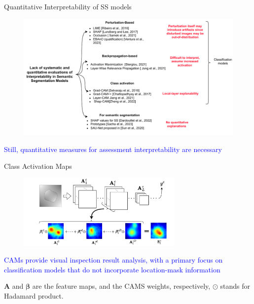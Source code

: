 \documentclass[aspectratio=169]{beamer}
\begin{document}
\begin{frame}{ Quantitative Interpretability of SS models}
\begin{figure}
    \centering
    \includegraphics[width=0.75\linewidth]{Figures/State-of-the-ar-obj3.pdf}
\end{figure}    
\vspace{-0.7cm}
\begin{center}
    \textcolor{blue}{Still, quantitative measures for assessment interpretability are necessary}
\end{center}

\end{frame}


\begin{frame}{Class Activation Maps}

\begin{figure}
    \centering
    \includegraphics[trim={1.1cm 0 0 0},clip,width=0.72\textwidth]{Figures/camsSchema.pdf}

\end{figure}

\begin{center}
    \textcolor{blue}{CAMs provide visual inspection result analysis, with a primary focus on classification models that do not incorporate location-mask information}
\end{center}

\hfill \footnotesize{$\mathbf{A}$ and $\boldsymbol{\beta}$ are the feature maps, and the CAMS weights, respectively, $\odot$ stands for Hadamard product.}


\end{frame}
\end{document}
